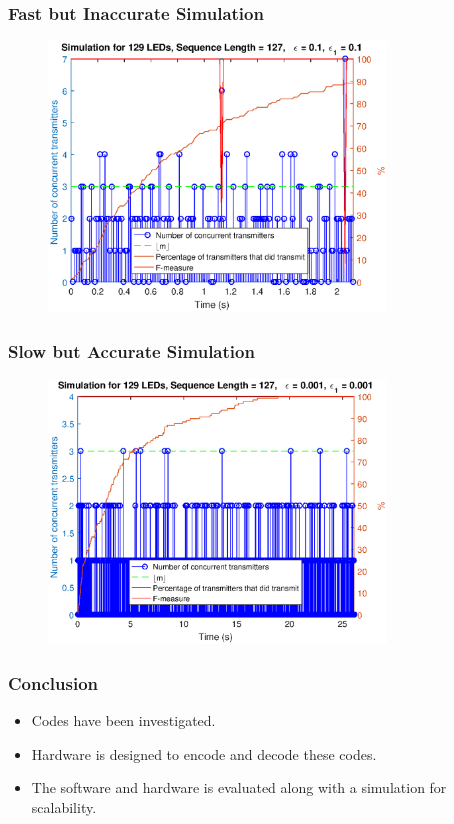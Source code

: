 \documentclass{beamer}
\begin{document}
	\begin{frame}\frametitle{Fast but Inaccurate Simulation}
		
		\begin{figure}
			\centering
			\includegraphics[width=0.8\textwidth]{simulation-1.eps}
		\end{figure}

	\end{frame}

	\begin{frame}\frametitle{Slow but Accurate Simulation}
		
		\begin{figure}
			\centering
			\includegraphics[width=0.8\textwidth]{simulation-2.eps}
		\end{figure}

	\end{frame}







	\begin{frame}\frametitle{Conclusion}

		\begin{itemize}

			\item Codes have been investigated.

			\item Hardware is designed to encode and decode these codes.

			\item The software and hardware is evaluated along with a simulation for scalability.

		\end{itemize}
		
		

	\end{frame}
\end{document}
